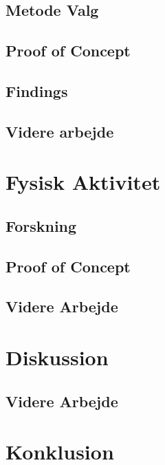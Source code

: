 \section{Metode Valg}

\section{Proof of Concept}

\section{Findings}\label{sec:findings}
\section{Videre arbejde}





\chapter{Fysisk Aktivitet}

\section{Forskning}

\section{Proof of Concept}

\section{Videre Arbejde}


\chapter{Diskussion}
\section{Videre Arbejde}

\chapter{Konklusion}



\label{bib:mybiblio}

\appendix

